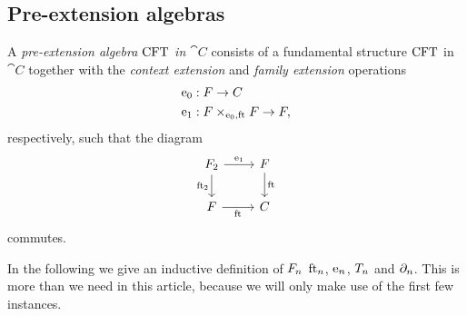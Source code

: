 \subsection{Pre-extension algebras}
\begin{defn}
A \emph{pre-extension algebra $\stesys$ in $\cat{C}$} consists of a fundamental structure
$\stesys$
in $\cat{C}$ together with the \emph{context extension} and \emph{family extension} operations
\begin{align*}
\ectxext &:\stesysf\to \stesysc\\
\efamext & :\stesysff\to \stesysf,
\end{align*}
respectively, such that the diagram
\begin{equation*}
\begin{tikzcd}
\stesysf_2 
  \ar{r}{\efamext} 
  \ar{d}[swap]{\eft[2]} 
  & 
\stesysf 
  \ar{d}{\eft}
  \\
\stesysf
  \ar{r}[swap]{\eft} 
  & 
\stesysc
\end{tikzcd}
\end{equation*}
commutes.
\end{defn}

In the following we give an inductive definition of $\stesysf_n$ $\eft[n]$, $\eext{n}$,
$\stesyst_n$ and $\ebd[n]$. This is more than we need in this article, because
we will only make use of the first few instances.

